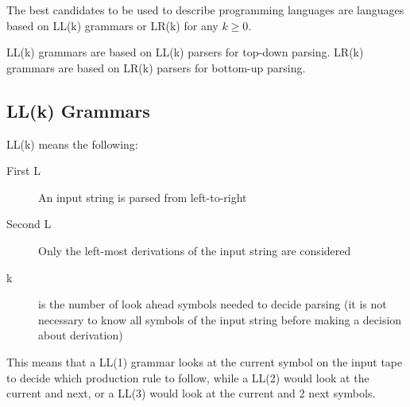 The best candidates to be used to describe programming languages are languages based on LL(k) grammars or LR(k) for any $k \geq 0$.

LL(k) grammars are based on LL(k) parsers for top-down parsing. LR(k) grammars are based on LR(k) parsers for bottom-up parsing.

\subsection{LL(k) Grammars }

LL(k) means the following:
\begin{description}
    \item[First L] An input string is parsed from left-to-right
    \item[Second L] Only the left-most derivations of the input string are considered
    \item[k] is the number of look ahead symbols needed to decide parsing (it is not necessary to know all symbols of the input string before making a decision about derivation)
\end{description}

This means that a LL(1) grammar looks at the current symbol on the input tape to decide which production rule to follow, while a LL(2) would look at the current and next, or a LL(3) would look at the current and 2 next symbols. 

